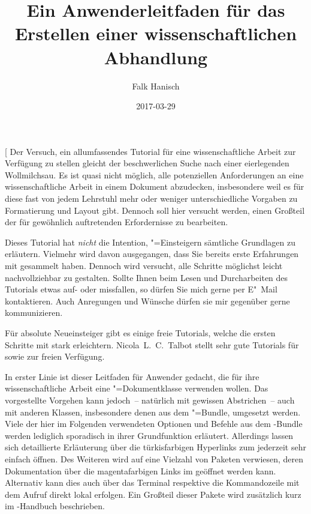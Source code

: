 \documentclass[%
  english,ngerman,%
  cdgeometry=no,DIV=12,%
  cd=false,cdfont=false,cdtitle=true,%
  headings=normal,%
  automark,%
  listof=toc,%
]{tudscrartcl}
\begin{document}
\subject{Tutorial für }
\title{%
  Ein Anwenderleitfaden für das Erstellen einer wissenschaftlichen Abhandlung%
}
\author{Falk Hanisch\TUDScriptContactTitle}
\date{2017-03-29}

\makeatletter
\begingroup%
  \def\and{, }%
  \let\thanks\@gobble%
  \let\footnote\@gobble%
  \let\emailaddress\@gobble%
\endgroup%
\makeatother

\StartTutorial[%
  Der Versuch, ein allumfassendes Tutorial für eine wissenschaftliche Arbeit 
  zur Verfügung zu stellen gleicht der beschwerlichen Suche nach einer 
  eierlegenden Wollmilchsau. Es ist quasi nicht möglich, alle potenziellen 
  Anforderungen an eine wissenschaftliche Arbeit in einem Dokument abzudecken, 
  insbesondere weil es für diese fast von jedem Lehrstuhl mehr oder weniger 
  unterschiedliche Vorgaben zu Formatierung und Layout gibt. Dennoch soll hier 
  versucht werden, einen Großteil der für gewöhnlich auftretenden Erfordernisse
  zu bearbeiten.
  
  Dieses Tutorial hat \emph{nicht} die Intention, "=Einsteigern 
  sämtliche Grundlagen zu erläutern. Vielmehr wird davon ausgegangen, dass Sie 
  bereits erste Erfahrungen mit  gesammelt haben. Dennoch wird 
  versucht, alle Schritte möglichst leicht nachvollziehbar zu gestalten. Sollte 
  Ihnen beim Lesen und Durcharbeiten des Tutorials etwas auf- oder missfallen, 
  so dürfen Sie mich gerne per E"~Mail kontaktieren. Auch Anregungen und 
  Wünsche dürfen sie mir gegenüber gerne kommunizieren.
  
  Für absolute Neueinsteiger gibt es einige freie Tutorials, welche die ersten 
  Schritte mit  stark erleichtern. Nicola~L.~C.~Talbot stellt 
  sehr gute Tutorials für 
  \cite{talbot2012} sowie 
  \cite{talbot2013} zur freien Verfügung.
  
  In erster Linie ist dieser Leitfaden für Anwender gedacht, die für ihre
  wissenschaftliche Arbeit eine \TUDScript"=Dokumentklasse verwenden wollen. 
  Das vorgestellte Vorgehen kann jedoch~-- natürlich mit gewissen Abstrichen~-- 
  auch mit anderen Klassen, insbesondere denen aus dem \KOMAScript"=Bundle, 
  umgesetzt werden. Viele der hier im Folgenden verwendeten Optionen und
  Befehle aus dem \TUDScript-Bundle werden lediglich sporadisch in ihrer 
  Grundfunktion erläutert. Allerdings lassen sich detaillierte Erläuterung über 
  die türkisfarbigen Hyperlinks zum   
  jederzeit sehr einfach öffnen. Des Weiteren wird auf eine Vielzahl von 
  Paketen verwiesen, deren Dokumentation über die magentafarbigen Links im 
  \CTAN* geöffnet werden kann. Alternativ kann dies auch über das Terminal 
  respektive die Kommandozeile mit dem Aufruf  
  direkt lokal erfolgen. Ein Großteil dieser Pakete wird zusätzlich kurz im 
  \TUDScript-Handbuch beschrieben.
  
\end{document}
